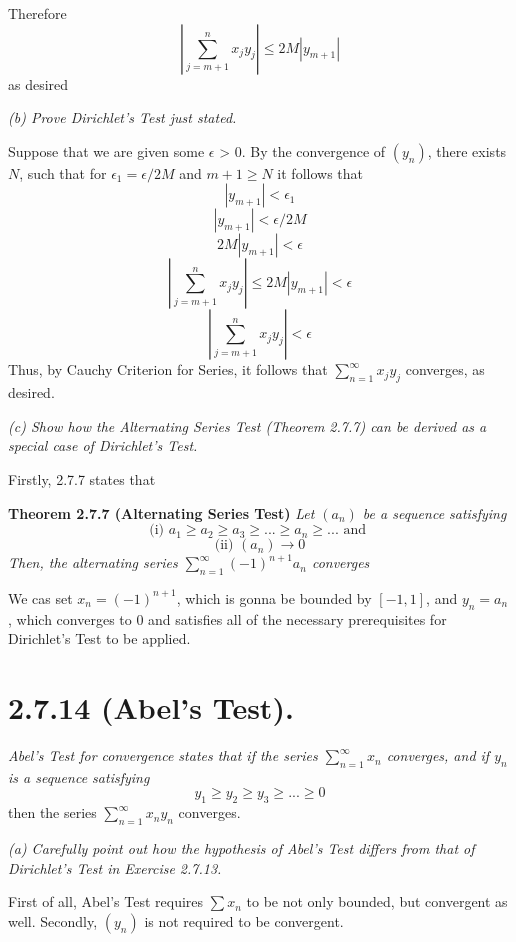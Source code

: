\documentclass[11pt,oneside,titlepage]{article}
\begin{document}
Therefore
$$\left|\sum_{j = m + 1}^{n} x_j y_j\right| \leq 2M|y_{m + 1}|$$
as desired

\textit{(b) Prove Dirichlet's Test just stated.}

Suppose that we are given some $\epsilon$ > 0. By the convergence of $(y_n)$,
there exists $N$, such that for  $\epsilon_1 = \epsilon / 2M$ and $m + 1 \geq N$ it
follows that
$$|y_{m + 1}| < \epsilon_1$$
$$|y_{m + 1}| < \epsilon / 2M$$
$$2M|y_{m + 1}| < \epsilon$$
$$\left|\sum_{j = m + 1}^{n} x_j y_j\right| \leq 2M|y_{m + 1}| < \epsilon$$
$$\left|\sum_{j = m + 1}^{n} x_j y_j\right|  < \epsilon$$
Thus, by Cauchy Criterion for Series, it follows that
$\sum_{n = 1}^{\infty} x_j y_j$ converges, as desired.

\textit{(c) Show how the Alternating Series Test (Theorem 2.7.7) can be
  derived as a special case of Dirichlet's Test.}

Firstly, 2.7.7 states that

\textbf{Theorem 2.7.7 (Alternating Series Test)}
\textit{Let $(a_n)$ be a sequence satisfying}
$$\text{(i) } a_1 \geq a_2 \geq a_3 \geq ... \geq a_n \geq ... \text{ and }$$
$$\text{(ii) } (a_n) \to 0$$
\textit{Then, the alternating series $\sum_{n = 1}^{\infty}(-1)^{n + 1} a_n$
  converges}

We cas set $x_n = (-1)^{n + 1}$, which is gonna be bounded by $[-1, 1]$, and
$y_n = a_n$, which converges to 0 and satisfies all of the necessary
prerequisites for Dirichlet's Test to be applied.

\section*{2.7.14 (Abel's Test).}
\textit{Abel's Test for convergence states that if the series
  $\sum_{n = 1}^{\infty} x_n$ converges, and if $y_n$ is a sequence
  satisfying  }
$$y_1 \geq y_2 \geq y_3 \geq ... \geq 0$$
then the series $\sum_{n = 1}^{\infty} x_n y_n$ converges.

\textit{(a) Carefully point out how the hypothesis of Abel's Test differs from
  that of Dirichlet's Test in Exercise 2.7.13.}

First of all, Abel's Test requires $\sum x_n$ to be not only bounded, but
convergent as well. Secondly, $(y_n)$ is not required to be convergent.
\end{document}
